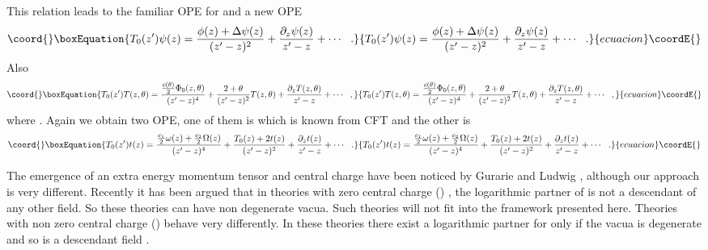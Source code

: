 \documentclass[a4paper,11pt]{article}
\begin{document}
This relation leads to the familiar OPE for
\coordHE{} and a new OPE
\begin{equation}\coord{}\boxEquation{\label{eq:a63}
T_{0}(z^{\prime})\psi(z)=\frac{\phi(z)+\Delta\psi(z)}{(z^{\prime}-z)^{2}}+
\frac{\partial_{z}\psi(z)}{z^{\prime}-z}+\cdots\:\:\:.
}{T_{0}(z^{\prime})\psi(z)=\frac{\phi(z)+\Delta\psi(z)}{(z^{\prime}-z)^{2}}+
\frac{\partial_{z}\psi(z)}{z^{\prime}-z}+\cdots\:\:\:.
}{ecuacion}\coordE{}\end{equation}
Also
\begin{equation}\coord{}\boxEquation{\label{eq:a64}
T_{0}(z^{\prime})T(z,\theta)=\frac{\frac{c(\theta)}{2}\Phi_{0}(z,\theta)}{(z^{\prime}-z)^{4}}
+\frac{2+\theta}{(z^{\prime}-z)^{2}}T(z,\theta)+\frac{\partial_{z}T(z,\theta)}{z^{\prime}-z}+\cdots\:\:\:,
}{T_{0}(z^{\prime})T(z,\theta)=\frac{\frac{c(\theta)}{2}\Phi_{0}(z,\theta)}{(z^{\prime}-z)^{4}}
+\frac{2+\theta}{(z^{\prime}-z)^{2}}T(z,\theta)+\frac{\partial_{z}T(z,\theta)}{z^{\prime}-z}+\cdots\:\:\:,
}{ecuacion}\coordE{}\end{equation}
where \coordHE{}. Again we obtain two OPE, one
of them is \coordHE{} which is known from CFT and
the other is
\begin{equation}\coord{}\boxEquation{\label{eq:a65}
T_{0}(z^{\prime})t(z)=\frac{\frac{c_1}{2}\omega(z)+\frac{c_2}{2}\Omega(z)}{(z^{\prime}-z)^{4}}
+\frac{T_{0}(z)+2t(z)}{(z^{\prime}-z)^{2}}+\frac{\partial_{z}t(z)}{z^{\prime}-z}+\cdots\:\:\:.
}{T_{0}(z^{\prime})t(z)=\frac{\frac{c_1}{2}\omega(z)+\frac{c_2}{2}\Omega(z)}{(z^{\prime}-z)^{4}}
+\frac{T_{0}(z)+2t(z)}{(z^{\prime}-z)^{2}}+\frac{\partial_{z}t(z)}{z^{\prime}-z}+\cdots\:\:\:.
}{ecuacion}\coordE{}\end{equation}

The emergence of an extra energy momentum tensor and central
charge have been noticed by Gurarie and Ludwig \cite{lud},
although our approach is very different. Recently it has been
argued \cite{nic} that in theories with zero central charge
(\coordHE{}) \coordHE{}, the logarithmic partner of \coordHE{} is not a
descendant of any other field. So these theories can have non
degenerate vacua. Such theories will not fit into the framework
presented here. Theories with non zero central charge (\coordHE{})
behave very differently. In these theories there exist a
logarithmic partner for \coordHE{} only if the vacua is degenerate
and so \coordHE{} is a descendant field \cite{nic}.
\end{document}
